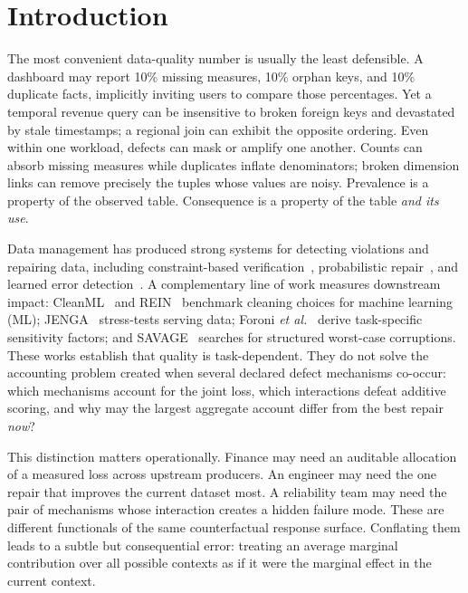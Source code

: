 \documentclass[conference]{IEEEtran}
\begin{document}
\section{Introduction}

The most convenient data-quality number is usually the least defensible. A dashboard may report 10\% missing measures, 10\% orphan keys, and 10\% duplicate facts, implicitly inviting users to compare those percentages. Yet a temporal revenue query can be insensitive to broken foreign keys and devastated by stale timestamps; a regional join can exhibit the opposite ordering. Even within one workload, defects can mask or amplify one another. Counts can absorb missing measures while duplicates inflate denominators; broken dimension links can remove precisely the tuples whose values are noisy. Prevalence is a property of the observed table. Consequence is a property of the table \emph{and its use}.

Data management has produced strong systems for detecting violations and repairing data, including constraint-based verification~\cite{schelter2018deequ}, probabilistic repair~\cite{rekatsinas2017holoclean}, and learned error detection~\cite{mahdavi2019raha}. A complementary line of work measures downstream impact: CleanML~\cite{li2021cleanml} and REIN~\cite{abdelaal2023rein} benchmark cleaning choices for machine learning (ML); JENGA~\cite{schelter2021jenga} stress-tests serving data; Foroni \emph{et al.}~\cite{foroni2021effects} derive task-specific sensitivity factors; and SAVAGE~\cite{zhu2025savage} searches for structured worst-case corruptions. These works establish that quality is task-dependent. They do not solve the accounting problem created when several declared defect mechanisms co-occur: which mechanisms account for the joint loss, which interactions defeat additive scoring, and why may the largest aggregate account differ from the best repair \emph{now}?

This distinction matters operationally. Finance may need an auditable allocation of a measured loss across upstream producers. An engineer may need the one repair that improves the current dataset most. A reliability team may need the pair of mechanisms whose interaction creates a hidden failure mode. These are different functionals of the same counterfactual response surface. Conflating them leads to a subtle but consequential error: treating an average marginal contribution over all possible contexts as if it were the marginal effect in the current context.
\end{document}
